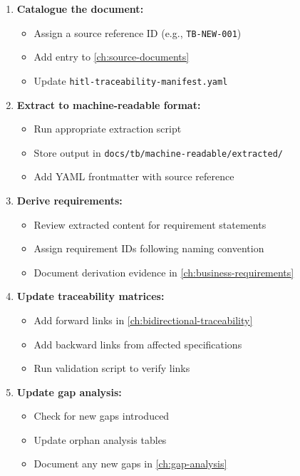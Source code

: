 \documentclass[11pt,a4paper,twoside]{report}
\newcommand{\srcref}[1]{\texttt{#1}}
\begin{document}
\begin{enumerate}
\item \textbf{Catalogue the document:}
\begin{itemize}[noitemsep]
\item Assign a source reference ID (e.g., \srcref{TB-NEW-001})
\item Add entry to \cref{ch:source-documents}
\item Update \texttt{hitl-traceability-manifest.yaml}
\end{itemize}

\item \textbf{Extract to machine-readable format:}
\begin{itemize}[noitemsep]
\item Run appropriate extraction script
\item Store output in \texttt{docs/tb/machine-readable/extracted/}
\item Add YAML frontmatter with source reference
\end{itemize}

\item \textbf{Derive requirements:}
\begin{itemize}[noitemsep]
\item Review extracted content for requirement statements
\item Assign requirement IDs following naming convention
\item Document derivation evidence in \cref{ch:business-requirements}
\end{itemize}

\item \textbf{Update traceability matrices:}
\begin{itemize}[noitemsep]
\item Add forward links in \cref{ch:bidirectional-traceability}
\item Add backward links from affected specifications
\item Run validation script to verify links
\end{itemize}

\item \textbf{Update gap analysis:}
\begin{itemize}[noitemsep]
\item Check for new gaps introduced
\item Update orphan analysis tables
\item Document any new gaps in \cref{ch:gap-analysis}
\end{itemize}
\end{enumerate}
\end{document}
